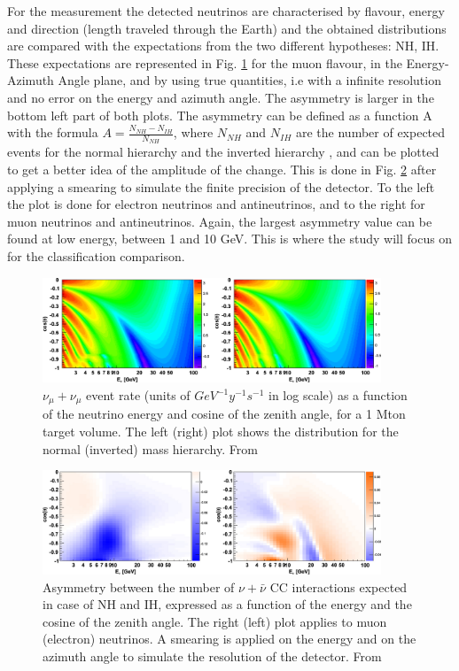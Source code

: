 For the measurement the detected neutrinos are characterised by flavour, energy and direction (length traveled through the Earth) and the obtained distributions are compared with the expectations from the two different hypotheses: NH, IH. These expectations are represented in Fig. \ref{fig:AIOJZOJ} for the muon flavour, in the Energy-Azimuth Angle plane, and by using true quantities, i.e with a infinite resolution and no error on the energy and azimuth angle. The asymmetry is larger in the bottom left part of both plots. The asymmetry can be defined as a function A with the formula $A=\frac{N_{NH}-N_{IH}}{N_{NH}}$, where $N_{NH}$ and $N_{IH}$ are the number of expected events for the normal hierarchy and the inverted hierarchy , and can be plotted to get a better idea of the amplitude of the change. This is done in Fig. \ref{fig:JUHDNB} after applying a smearing to simulate the finite precision of the detector. To the left the plot is done for electron neutrinos and antineutrinos, and to the right for muon neutrinos and antineutrinos. Again, the largest asymmetry value can be found at low energy, between 1 and 10 GeV. This is where the study will focus on for the classification comparison.

\begin{figure}[h!]
    \centering
    \includegraphics[width=0.90\textwidth]{fig/numu_IH_vs_NH.jpg}
    \caption{
    $\nu_\mu + \nu_\mu$ event rate (units of $GeV^{-1}y^{-1}s^{-1}$ in log scale) as a function of the neutrino energy and cosine of the zenith angle, for a 1 Mton target volume. The left (right) plot shows the distribution for the normal (inverted) mass hierarchy. From \citep{Adrian-Martinez:2016fdl}}
    \label{fig:AIOJZOJ}
\end{figure}

\begin{figure}[h!]
    \centering
    \includegraphics[width=0.90\textwidth]{fig/numu_vs_nue_Asymmetry.jpg}
    \caption{Asymmetry between the number of $\nu +\bar{\nu }$ CC interactions expected in case of NH and IH, expressed as a function of the energy and the cosine of the zenith angle. The right (left) plot applies to muon (electron) neutrinos. A smearing is applied on the energy and on the azimuth angle to simulate the resolution of the detector. From \citep{Adrian-Martinez:2016fdl}}
    \label{fig:JUHDNB}
\end{figure}

